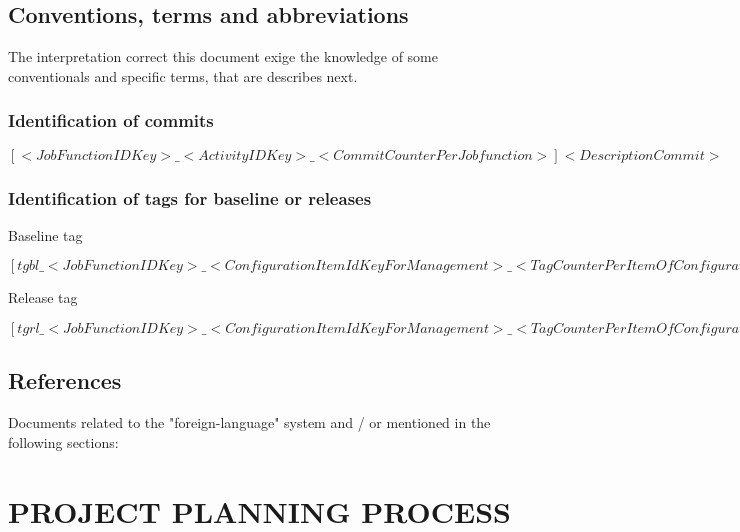 \documentclass[11pt, twoside, a4paper]{book}
\begin{document}
            \section{Conventions, terms and abbreviations}
                
                The interpretation correct this document exige the knowledge of some conventionals and specific terms, that are describes next.	                
                
                \subsection{Identification of commits}
                
                	\begin{center}
                		$[<Job Function ID Key>\_<Activity ID Key>\_<Commit Counter Per Job function>] <Description Commit>$
                	\end{center}
                
                \subsection{Identification of tags for baseline or releases}

					\begin{center}
						Baseline tag													

            			$[tgbl\_<Job Function ID Key>\_<Configuration Item Id Key For Management>\_<Tag Counter Per Item Of Configuration>]$
					\end{center}					                			

        			\begin{center}
		   				Release tag					        			
        			
            			$[tgrl\_<Job Function ID Key>\_<Configuration Item Id Key For Management>\_<Tag Counter Per Item Of Configuration>]	$	
					\end{center}					                
					
            \section{References}
                    
                    Documents related to the "foreign-language" system and / or mentioned in the following sections:
            
        \chapter{PROJECT PLANNING PROCESS}
\end{document}
